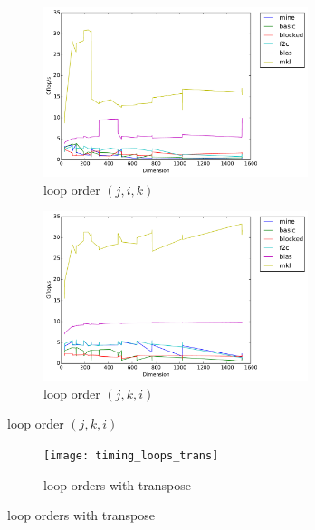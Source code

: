 \documentclass[12pt]{article}
\numberwithin{equation}{section}
\begin{document}
\begin{figure}[!ht]
   \begin{subfigure}
      \centering
        \begin{center}
      \includegraphics[width=0.85\textwidth] {jik}
        \end{center}
      \label{aload0}
      \caption{loop order $(j, i, k)$}
  \end{subfigure}
  \begin{subfigure}
      \centering
        \begin{center}
      \includegraphics[width=0.85\textwidth] {jki}
        \end{center}
      \label{aload1}
      \caption{loop order $(j, k, i)$}
  \end{subfigure}

\end{figure}

\begin{figure}[!ht]
  \begin{subfigure}
    \centering
      \begin{center}
    \texttt{[image: timing\_loops\_trans]}
      \end{center}
    \label{aload1}
    \caption{loop orders with transpose}
  \end{subfigure}

\end{figure}
\end{document}
